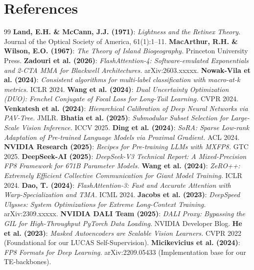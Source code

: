 \documentclass[10pt,twocolumn,letterpaper]{article}
\begin{document}
\section*{References}

\begin{thebibliography}{99}
 \textbf{Land, E.H. \& McCann, J.J. (1971)}: \textit{Lightness and the Retinex Theory.} Journal of the Optical Society of America, 61(1):1--11.
 \textbf{MacArthur, R.H. \& Wilson, E.O. (1967)}: \textit{The Theory of Island Biogeography.} Princeton University Press.
     \textbf{Zadouri et al. (2026)}: \textit{FlashAttention-4: Software-emulated Exponentials and 2-CTA MMA for Blackwell Architectures.} arXiv:2603.xxxxx.
 \textbf{Nowak-Vila et al. (2024)}: \textit{Consistent algorithms for multi-label classification with macro-at-k metrics.} ICLR 2024.
 \textbf{Wang et al. (2024)}: \textit{Dual Uncertainty Optimization (DUO): Fenchel Conjugate of Focal Loss for Long-Tail Learning.} CVPR 2024.
 \textbf{Venkatesh et al. (2024)}: \textit{Hierarchical Calibration of Deep Neural Networks via PAV-Tree.} JMLR.
 \textbf{Bhatia et al. (2025)}: \textit{Submodular Subset Selection for Large-Scale Vision Inference.} ICCV 2025.
 \textbf{Ding et al. (2024)}: \textit{SoRA: Sparse Low-rank Adaptation of Pre-trained Language Models via Proximal Gradient.} ACL 2024.
     \textbf{NVIDIA Research (2025)}: \textit{Recipes for Pre-training LLMs with MXFP8.} GTC 2025.
     \textbf{DeepSeek-AI (2025)}: \textit{DeepSeek-V3 Technical Report: A Mixed-Precision FP8 Framework for 671B Parameter Models.}
     \textbf{Wang et al. (2024)}: \textit{ZeRO++: Extremely Efficient Collective Communication for Giant Model Training.} ICLR 2024.
     \textbf{Dao, T. (2024)}: \textit{FlashAttention-3: Fast and Accurate Attention with Warp-Specialization and TMA.} ICML 2024.
     \textbf{Jacobs et al. (2023)}: \textit{DeepSpeed Ulysses: System Optimizations for Extreme Long-Context Training.} arXiv:2309.xxxxx.
     \textbf{NVIDIA DALI Team (2025)}: \textit{DALI Proxy: Bypassing the GIL for High-Throughput PyTorch Data Loading.} NVIDIA Developer Blog.
     \textbf{He et al. (2023)}: \textit{Masked Autoencoders are Scalable Vision Learners.} CVPR 2022 (Foundational for our LUCAS Self-Supervision).
     \textbf{Micikevicius et al. (2024)}: \textit{FP8 Formats for Deep Learning.} arXiv:2209.05433 (Implementation base for our TE-backbones).

\end{thebibliography}
\end{document}
